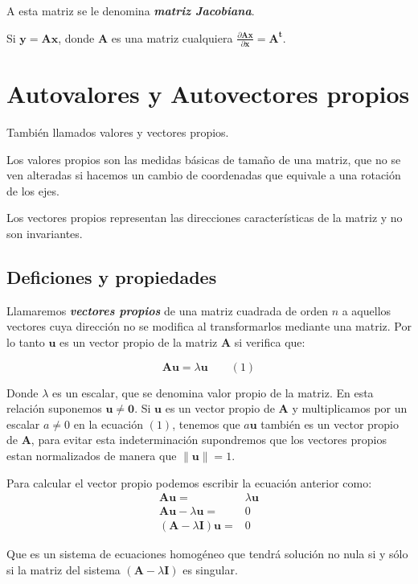 \documentclass[12pt,letterpaper]{report} %
\begin{document}
A esta matriz se le denomina \textit{\textbf{matriz Jacobiana}}.

Si $\mathbf{y}=\mathbf{Ax}$, donde $\mathbf{A}$ es una matriz cualquiera $\frac{\partial \mathbf{Ax}}{\partial \mathbf{x}}=\mathbf{A^t}$.

\section{Autovalores y Autovectores propios}

También llamados valores y vectores propios. 

Los valores propios son las medidas básicas de tamaño de una matriz, que no se ven alteradas si hacemos un cambio de coordenadas que equivale a una rotación de los ejes.

Los vectores propios representan las direcciones características de la matriz y no son invariantes. 

\subsection{Deficiones y propiedades}

Llamaremos \textit{\textbf{vectores propios}} de una matriz cuadrada de orden $n$ a aquellos vectores cuya dirección no se modifica al transformarlos mediante una matriz. Por lo tanto $\mathbf{u}$ es un vector propio de la matriz $\mathbf{A}$ si verifica que:

$$\mathbf{Au}=\lambda\mathbf{u} \qquad (1)$$ 

Donde $\lambda$ es un escalar, que se denomina valor propio de la matriz. En esta relación suponemos $\mathbf{u} \ne \mathbf{0}$. Si $\mathbf{u}$ es un vector propio de $\mathbf{A}$ y multiplicamos por un escalar $a \ne 0$ en la ecuación $(1)$, tenemos que $a\mathbf{u}$ también es un vector propio de $\mathbf{A}$, para evitar esta indeterminación supondremos que los vectores propios estan normalizados de manera que $\left\| \mathbf{u} \right\|=1$.

Para calcular el vector propio podemos escribir la ecuación anterior como:
$$
\begin{array}{rl}
\mathbf{Au} = & \lambda\mathbf{u}\\
\mathbf{Au}- \lambda\mathbf{u} = & 0\\
(\mathbf{A}- \lambda\mathbf{I})\mathbf{u} = & 0
\end{array}
$$

Que es un sistema de ecuaciones homogéneo que tendrá solución no nula si y sólo si la matriz del sistema $(\mathbf{A}- \lambda\mathbf{I})$ es singular.
\end{document}
